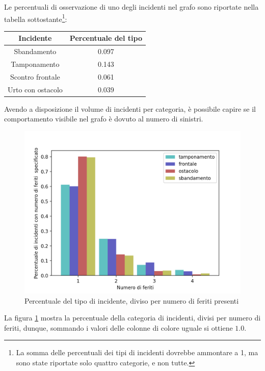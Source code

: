 \documentclass[a4paper]{report}
\begin{document}
Le percentuali di osservazione di uno degli incidenti nel grafo sono riportate nella 
tabella sottostante\footnote{La somma delle percentuali dei tipi di incidenti dovrebbe 
ammontare a 1, ma sono state riportate solo quattro categorie, e non tutte.}: 

\begin{center}
    \def\arraystretch{1.5}%
    \begin{tabular}{ |c|c| } 
    \hline
    Incidente & Percentuale del tipo \\ 
    \hline
    \rowcolor{TableGray}
    Sbandamento       & 0.097 \\
    Tamponamento      & 0.143 \\
    \rowcolor{TableGray}
    Scontro frontale  & 0.061 \\
    Urto con ostacolo & 0.039 \\
    \hline
    \end{tabular}
\end{center}

Avendo a disposizione il volume di incidenti per categoria, è possibile capire se il comportamento 
visibile nel grafo è dovuto al numero di sinistri. 

\begin{figure}
    \includegraphics[width=\linewidth]{../src/incidenti/incidenti_senza_coords/natura_incidente/perc_natura_incidente.png}
    \caption{Percentuale del tipo di incidente, diviso per numero di feriti presenti}
    \label{fig:perc-numero-feriti}
\end{figure}

La figura \ref{fig:perc-numero-feriti} mostra la percentuale della categoria di incidenti, divisi per 
numero di feriti, dunque, sommando i valori delle colonne di colore uguale si ottiene $1.0$.
\end{document}
